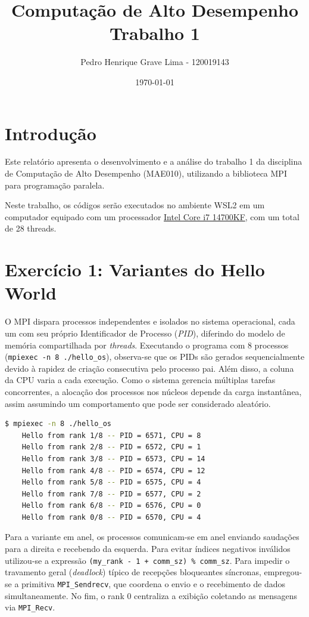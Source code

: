 \documentclass[a4paper, 12pt]{article}
\title{\textbf{Computação de Alto Desempenho}\\Trabalho 1\\\vspace{10cm}}
\author{
Pedro Henrique Grave Lima - 120019143
}
\date{\today}
\begin{document}
\maketitle
\newpage

\section*{Introdução}
Este relatório apresenta o desenvolvimento e a análise do trabalho 1 da disciplina de Computação de Alto Desempenho (MAE010), utilizando a biblioteca MPI para programação paralela.

Neste trabalho, os códigos serão executados no ambiente WSL2 em um computador equipado com um processador \href{https://www.intel.com.br/content/www/br/pt/products/sku/236789/intel-core-i7-processor-14700kf-33m-cache-up-to-5-60-ghz/specifications.html}{Intel Core i7 14700KF}, com um total de 28 threads.

\section{Exercício 1: Variantes do Hello World}

O MPI dispara processos independentes e isolados no sistema operacional, cada um com seu próprio Identificador de Processo (\textit{PID}), diferindo do modelo de memória compartilhada por \textit{threads}. Executando o programa com 8 processos (\verb|mpiexec -n 8 ./hello_os|), observa-se que os PIDs são gerados sequencialmente devido à rapidez de criação consecutiva pelo processo pai. Além disso, a coluna da CPU varia a cada execução. Como o sistema gerencia múltiplas tarefas concorrentes, a alocação dos processos nos núcleos depende da carga instantânea, assim assumindo um comportamento que pode ser considerado aleatório.

\begin{lstlisting}[language=bash, caption=Exemplo de uma execução do programa, basicstyle=\ttfamily\footnotesize]
    $ mpiexec -n 8 ./hello_os
    Hello from rank 1/8 -- PID = 6571, CPU = 8
    Hello from rank 2/8 -- PID = 6572, CPU = 1
    Hello from rank 3/8 -- PID = 6573, CPU = 14
    Hello from rank 4/8 -- PID = 6574, CPU = 12
    Hello from rank 5/8 -- PID = 6575, CPU = 4
    Hello from rank 7/8 -- PID = 6577, CPU = 2
    Hello from rank 6/8 -- PID = 6576, CPU = 0
    Hello from rank 0/8 -- PID = 6570, CPU = 4
\end{lstlisting}

Para a variante em anel, os processos comunicam-se em anel enviando saudações para a direita e recebendo da esquerda. Para evitar índices negativos inválidos utilizou-se a expressão \verb|(my_rank - 1 + comm_sz) % comm_sz|. Para impedir o travamento geral (\textit{deadlock}) típico de recepções bloqueantes síncronas, empregou-se a primitiva \verb|MPI_Sendrecv|, que coordena o envio e o recebimento de dados simultaneamente. No fim, o rank 0 centraliza a exibição coletando as mensagens via \verb|MPI_Recv|.
\end{document}
